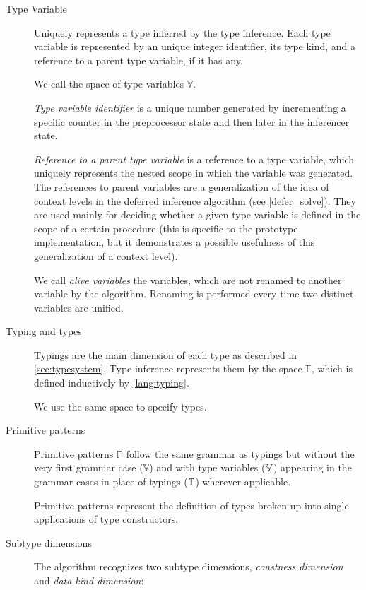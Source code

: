 \begin{description}
    \item[Type Variable] Uniquely represents a type inferred by the type inference. Each type variable is represented by an unique integer identifier, its type kind, and a reference to a parent type variable, if it has any.

    We call the space of type variables $\mathbb{V}$.

    \emph{Type variable identifier} is a unique number generated by incrementing a specific counter in the preprocessor state and then later in the inferencer state.

    \emph{Reference to a parent type variable} is a reference to a type variable, which uniquely represents the nested scope in which the variable was generated. The references to parent variables are a generalization of the idea of context levels in the deferred inference algorithm (see \cref{defer_solve}). They are used mainly for deciding whether a given type variable is defined in the scope of a certain procedure (this is specific to the prototype implementation, but it demonstrates a possible usefulness of this generalization of a context level).

    We call \emph{alive variables} the variables, which are not renamed to another variable by the algorithm. Renaming is performed every time two distinct variables are unified.

    \item[Typing and types] Typings are the main dimension of each type as described in \cref{sec:typesystem}. Type inference represents them by the space $\mathbb{T}$, which is defined inductively by \cref{lang:typing}.

    We use the same space to specify types.

    \item[Primitive patterns] Primitive patterns $\mathbb{P}$ follow the same grammar as typings but without the very first grammar case ($\mathbb{V}$) and with type variables ($\mathbb{V}$) appearing in the grammar cases in place of typings ($\mathbb{T}$) wherever applicable.

    Primitive patterns represent the definition of types broken up into single applications of type constructors.

    \item[Subtype dimensions] The algorithm recognizes two subtype dimensions, \emph{constness dimension} and \emph{data kind dimension}:


\end{description}
